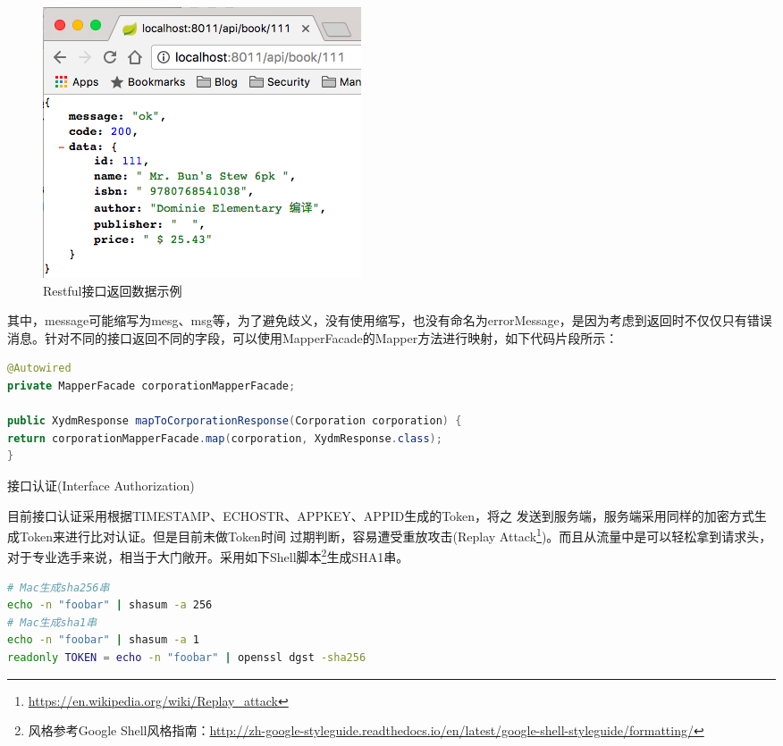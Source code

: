 \documentclass[12pt]{book}
\makeatletter
\numberwithin{dummy}{section}
\theoremstyle{ocrenumbox}
\theoremstyle{blacknumex}
\theoremstyle{blacknumbox}
\theoremstyle{ocrenum}
\renewcommand{\subsection}{\@startsection {subsection}{2}{\z@}
	{-3ex \@plus -0.1ex \@minus -.4ex}
	{0.5ex \@plus.2ex }
	{\normalfont\sffamily\bfseries}}
\newlength\esp
\makeatother
\begin{document}
\begin{figure}[htbp]
	\centering
	\includegraphics[scale=0.6]{restresponse.png}
	\caption{Restful接口返回数据示例}
	\label{fig:restresponse}
\end{figure}

其中，message可能缩写为mesg、msg等，为了避免歧义，没有使用缩写，也没有命名为errorMessage，是因为考虑到返回时不仅仅只有错误消息。针对不同的接口返回不同的字段，可以使用MapperFacade的Mapper方法进行映射，如下代码片段所示：

\begin{lstlisting}[language=Java]
@Autowired
private MapperFacade corporationMapperFacade;

public XydmResponse mapToCorporationResponse(Corporation corporation) {
return corporationMapperFacade.map(corporation, XydmResponse.class);
}
\end{lstlisting}

\subsection{接口认证(Interface Authorization)}
\label{sec:authorization}

目前接口认证采用根据TIMESTAMP、ECHOSTR、APPKEY、APPID生成的Token，将之
发送到服务端，服务端采用同样的加密方式生成Token来进行比对认证。但是目前未做Token时间
过期判断，容易遭受重放攻击(Replay Attack\footnote{\url{https://en.wikipedia.org/wiki/Replay_attack}})。而且从流量中是可以轻松拿到请求头，对于专业选手来说，相当于大门敞开。采用如下Shell脚本\footnote{风格参考Google Shell风格指南：\url{http://zh-google-styleguide.readthedocs.io/en/latest/google-shell-styleguide/formatting/}}生成SHA1串。

\begin{lstlisting}[language=Bash]
# Mac生成sha256串
echo -n "foobar" | shasum -a 256
# Mac生成sha1串
echo -n "foobar" | shasum -a 1
readonly TOKEN = echo -n "foobar" | openssl dgst -sha256
\end{lstlisting}
\end{document}

